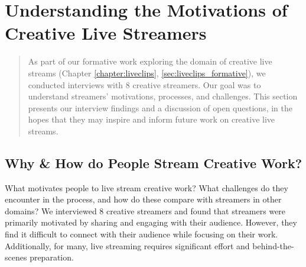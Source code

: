 \chapter{Understanding the Motivations of Creative Live Streamers}
\label{chapter:appendix}

\begin{quote}
As part of our formative work exploring the domain of creative live streams (Chapter \ref{chapter:liveclips}, \autoref{sec:liveclips_formative}), we conducted interviews with 8 creative streamers. Our goal was to understand streamers' motivations, processes, and challenges. This section presents our interview findings and a discussion of open questions, in the hopes that they may inspire and inform future work on creative live streams.
\end{quote}

\section{Why \& How do People Stream Creative Work?}
What motivates people to live stream creative work? What challenges do they encounter in the process, and how do these compare with streamers in other domains? We interviewed 8 creative streamers and found that streamers were primarily motivated by sharing and engaging with their audience. However, they find it difficult to connect with their audience while focusing on their work. Additionally, for many, live streaming requires significant effort and behind-the-scenes preparation. 


